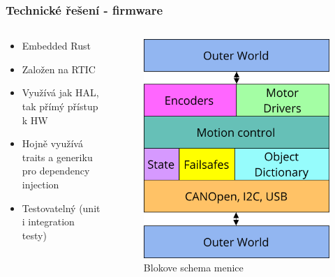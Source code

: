 \documentclass[%
  12pt,       				%
	t,                  %
	aspectratio=1610,   %
	unicode,						%
]{beamer}				    	%
\begin{document}
\begin{frame}
	\frametitle{Technické řešení - firmware}
	\begin{columns}[T] 								%
		\begin{column}{0.5\textwidth}		%
			\begin{itemize}
				\item Embedded Rust
				\item Založen na RTIC
				\item Využívá jak HAL, tak přímý přístup k HW
				\item Hojně využívá traits a generiku pro dependency injection
				\item Testovatelný (unit i integration testy)
			\end{itemize}
		\end{column}
		\begin{column}{0.5\textwidth}		%
			\begin{figure}%
				\centering
				\includegraphics[width=0.7\columnwidth]{../Thesis/obrazky/firmware_arch}
				\caption{Blokove schema menice}%
				\label{fig:sm4_block}
			\end{figure}
		\end{column}
	\end{columns}
\end{frame}
\end{document}
